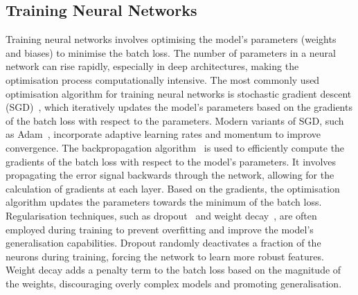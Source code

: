 \subsection{Training Neural Networks}
\label{sec:training_nn}
Training neural networks involves optimising the model's parameters (weights and biases) to minimise the batch loss. The number of parameters in a neural network can rise rapidly, especially in deep architectures, making the optimisation process computationally intensive. The most commonly used optimisation algorithm for training neural networks is stochastic gradient descent (SGD)~\cite{sgd}, which iteratively updates the model's parameters based on the gradients of the batch loss with respect to the parameters. Modern variants of SGD, such as Adam~\cite{adam}, incorporate adaptive learning rates and momentum to improve convergence.
The backpropagation algorithm~\cite{backpropagation} is used to efficiently compute the gradients of the batch loss with respect to the model's parameters. It involves propagating the error signal backwards through the network, allowing for the calculation of gradients at each layer. Based on the gradients, the optimisation algorithm updates the parameters towards the minimum of the batch loss.
Regularisation techniques, such as dropout~\cite{dropout} and weight decay~\cite{adamW}, are often employed during training to prevent overfitting and improve the model's generalisation capabilities. Dropout randomly deactivates a fraction of the neurons during training, forcing the network to learn more robust features. Weight decay adds a penalty term to the batch loss based on the magnitude of the weights, discouraging overly complex models and promoting generalisation.

